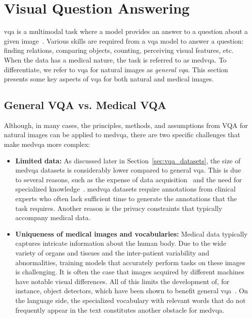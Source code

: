 \section{Visual Question Answering}
\label{sec:vqa_background}
\gls{vqa} is a multimodal task where a model provides an answer to a question about a given image~\cite{antol2015vqa}. Various skills are required from a \gls{vqa} model to answer a question: finding relations, comparing objects, counting, perceiving visual features, etc. When the data has a medical nature, the task is referred to as \gls{medvqa}. To differentiate, we refer to \gls{vqa} for natural images as \textit{general \gls{vqa}}. This section presents some key aspects of \gls{vqa} for both natural and medical images. 

\subsection{General VQA vs. Medical VQA}
\label{subsec:vqa_vs_medvqa}

Although, in many cases, the principles, methods, and assumptions from VQA for natural images can be applied to \gls{medvqa}, there are two specific challenges that make \gls{medvqa} more complex:

\begin{itemize}
    \item \textbf{Limited data:} As discussed later in Section~\ref{sec:vqa_datasets}, the size of \gls{medvqa} datasets is considerably lower compared to general \gls{vqa}. This is due to several reasons, such as the expense of data acquisition~\cite{liu2019effective} and the need for specialized knowledge~\cite{liao2020aiml}. \gls{medvqa} datasets require annotations from clinical experts who often lack sufficient time to generate the annotations that the task requires. Another reason is the privacy constraints that typically accompany medical data.
    
    \item \textbf{Uniqueness of medical images and vocabularies:} Medical data typically captures intricate information about the human body. Due to the wide variety of organs and tissues and the inter-patient variability and abnormalities, training models that accurately perform tasks on these images is challenging. It is often the case that images acquired by different machines have notable visual differences. All of this limits the development of, for instance, object detectors, which have been shown to benefit general \gls{vqa}~\cite{gupta2021hierarchical}. On the language side, the specialized vocabulary with relevant words that do not frequently appear in the text constitutes another obstacle for \gls{medvqa}.
    
\end{itemize}

